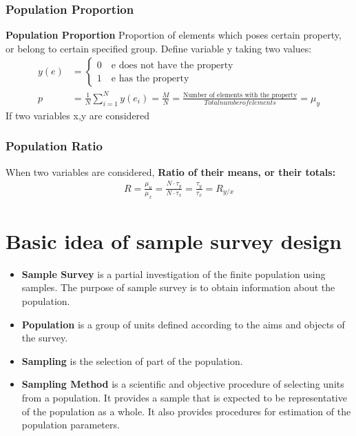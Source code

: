\documentclass{article}
\theoremstyle{definition}
\theoremstyle{thrm}
\theoremstyle{lma}
\theoremstyle{ppst}
\theoremstyle{crlr}
\begin{document}
\subsubsection{Population Proportion}
\textbf{Population Proportion }Proportion of elements which poses certain property, or belong to certain specified group. Define variable y taking two values:
\begin{align*}
	y(e) &= 
	\begin{cases}
		0 \quad \text{e does not have the property}\\
		1 \quad \text{e has the property}
	\end{cases}\\
	p &= \frac{1}{N}\sum_{i=1}^N y(e_i) = \frac{M}{N} = \frac{\text{Number of elements with the property}}{Total number of elements} = \mu_y
\end{align*}
If two variables x,y are considered
\subsubsection{Population Ratio}
When two variables are considered, \textbf{Ratio of their means, or their totals:}
\begin{align*}
	R = \frac{\mu_u}{\mu_x} = \frac{N\cdot \tau_y}{N\cdot \tau_x} = \frac{\tau_y}{\tau_x} = R_{y/x}
\end{align*}


\section{Basic idea of sample survey design}
\begin{itemize}
	\item \textbf{Sample Survey} is a partial investigation of the finite population using samples. The purpose of sample survey is to obtain information about the population.
	\item \textbf{Population} is a group of units defined according to the aims and objects of the survey. 
	\item \textbf{Sampling} is the selection of part of the population.
	\item \textbf{Sampling Method} is a scientific and objective procedure of selecting units from a population. It provides a sample that is expected to be representative of the population as a whole. It also provides procedures for estimation of the population parameters. 
\end{itemize}
\end{document}

